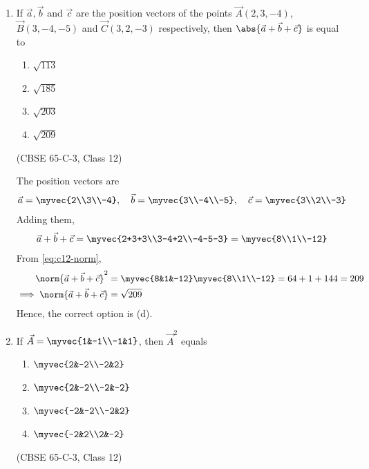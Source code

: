 \begin{enumerate}[label=\thesubsection.\arabic*., ref=\thesubsection.\theenumi]
\item If $\vec{a},\vec{b}$ and $\vec{c}$ are the position vectors of the points $\vec{A}(2,3,-4)$, $\vec{B}(3,-4,-5)$ and $\vec{C}(3,2,-3)$ respectively, then $\abs{\vec{a}+\vec{b}+\vec{c}}$ is equal to
\begin{enumerate}
\item $\sqrt{113}$
\item $\sqrt{185}$
\item $\sqrt{203}$
\item $\sqrt{209}$
\end{enumerate}
\hfill (CBSE 65-C-3, Class 12)
 
\solution The position vectors are
\begin{align}
\vec{a} = \myvec{2\\3\\-4},\quad
\vec{b} = \myvec{3\\-4\\-5},\quad
\vec{c} = \myvec{3\\2\\-3}
\end{align}
Adding them,
\begin{align}
\vec{a}+\vec{b}+\vec{c} = \myvec{2+3+3\\3-4+2\\-4-5-3} = \myvec{8\\1\\-12}
\end{align}
From \eqref{eq:c12-norm},
\begin{align}
\norm{\vec{a}+\vec{b}+\vec{c}}^2
&= \myvec{8&1&-12}\myvec{8\\1\\-12}
= 64+1+144 = 209
\\
\implies \norm{\vec{a}+\vec{b}+\vec{c}} &= \sqrt{209}
\end{align}
Hence, the correct option is (d).
 
\begin{center}
\end{center}
 
\item If $\vec{A}=\myvec{1&-1\\-1&1}$, then $\vec{A}^2$ equals
\begin{enumerate}
\item $\myvec{2&-2\\-2&2}$
\item $\myvec{2&-2\\-2&-2}$
\item $\myvec{-2&-2\\-2&2}$
\item $\myvec{-2&2\\2&-2}$
\end{enumerate}
\hfill (CBSE 65-C-3, Class 12)
 

\end{enumerate}

